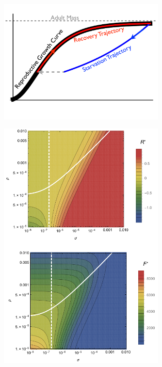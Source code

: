 \documentclass[12pt,english]{article}
\begin{document}
\begin{spacing}{1.9}
\begin{table}[h]
\begin{center}
\begin{tabular}{| p{1.2cm}| p{3.2cm} | p{2.6cm} | p{3.2cm} | }
      
   \hline
    \end{tabular}
    \end{center}
   \end{table}

\clearpage

 \begin{figure}[h]
 	\centering
 	\includegraphics[width=0.75\textwidth]{Growth-trajectory-diagram.pdf}
 	\caption{
 	}
 	\label{growth-diagram}
 \end{figure}

\clearpage


 \begin{figure}[h]
 	\centering
 	\includegraphics[width=0.75\textwidth]{fig_FixedPoint.pdf}
 	\caption{
 	}
 	\label{Hopfb}
 \end{figure}



\end{spacing}
\end{document}
